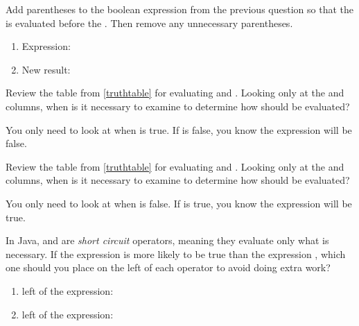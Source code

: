 \Q Add parentheses to the boolean expression from the previous question so that the \java{&&} is evaluated before the \java{!}. Then remove any unnecessary parentheses.

\begin{enumerate}
\item Expression: 
\item New result: 
\end{enumerate}


\Q Review the table from \ref{truthtable} for evaluating \java{&&} and \java{||}.
Looking only at the  and \java{&&} columns, when is it necessary to examine  to determine how  should be evaluated?

\begin{answer}
You only need to look at  when  is true.
If  is false, you know the expression will be false.
\end{answer}


\Q Review the table from \ref{truthtable} for evaluating \java{&&} and \java{||}.
Looking only at the  and \java{||} columns, when is it necessary to examine  to determine how  should be evaluated?

\begin{answer}
You only need to look at  when  is false.
If  is true, you know the expression will be true.
\end{answer}


\Q In Java, \java{&&} and \java{||} are \emph{short circuit} operators, meaning they evaluate only what is necessary.
If the expression  is more likely to be true than the expression , which one should you place on the left of each operator to avoid doing extra work?

\begin{enumerate}
\item left of the \java{&&} expression: 
\item left of the \java{||} expression: 
\end{enumerate}
